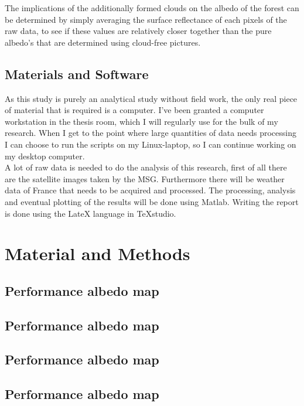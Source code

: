 \documentclass{article}
\begin{document}
The implications of the additionally formed clouds on the albedo of the forest can be determined by simply averaging the surface reflectance of each pixels of the raw data, to see if these values are relatively closer together than the pure albedo's that are determined using cloud-free pictures.\\

\subsection{Materials and Software}
As this study is purely an analytical study without field work, the only real piece of material that is required is a computer. I've been granted a computer workstation in the thesis room, which I will regularly use for the bulk of my research. When I get to the point where large quantities of data needs processing I can choose to run the scripts on my Linux-laptop, so I can continue working on my desktop computer.\\

A lot of raw data is needed to do the analysis of this research, first of all there are the satellite images taken by the MSG. Furthermore there will be weather data of France that needs to be acquired and processed. The processing, analysis and eventual plotting of the results will be done using Matlab. Writing the report is done using the LateX language in TeXstudio. \\




\newpage
\section{Material and Methods}  %

\subsection{Performance albedo map} %

\subsection{Performance albedo map} %

\subsection{Performance albedo map} %

\subsection{Performance albedo map} %
\end{document}
